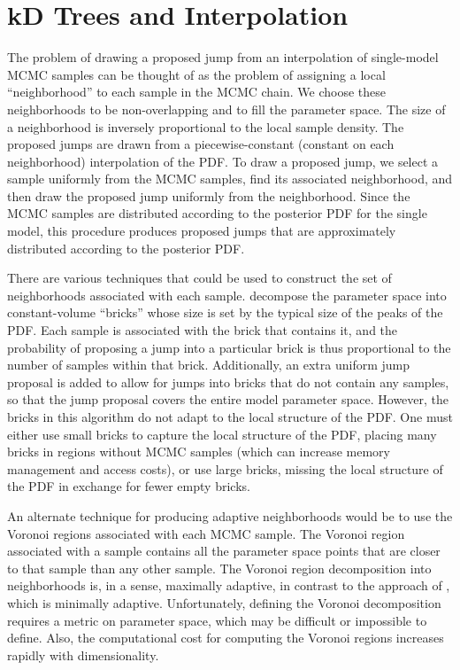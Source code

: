 \documentclass{iopart}
\begin{document}
\section{kD Trees and Interpolation}
\label{sec:kDTree}

The problem of drawing a proposed jump from an interpolation of
single-model MCMC samples can be thought of as the problem of assigning
a local ``neighborhood'' to each sample in the MCMC chain.
We choose these neighborhoods to be non-overlapping and to fill the parameter
space.  The size of a
neighborhood is inversely proportional to the local sample density.
The proposed jumps are drawn from a piecewise-constant (constant on
each neighborhood) interpolation of the PDF.  
To draw a proposed jump, we select a sample uniformly from the
MCMC samples, find its associated neighborhood, and then draw the
proposed jump uniformly from the neighborhood.  Since the MCMC samples
are distributed according to the posterior PDF for the single model,
this procedure produces proposed jumps that are approximately
distributed according to the posterior PDF.  

There are various
techniques that could be used to construct the set of neighborhoods
associated with each sample.
\cite{Littenberg2009} decompose the parameter space into
constant-volume ``bricks'' whose size is set by the typical size of
the peaks of the PDF.  Each sample is associated with the brick that
contains it, and the probability of proposing a jump into a particular brick is thus proportional to the
number of samples within that brick.  Additionally, an extra uniform jump proposal is added to allow for jumps into bricks that do not contain any samples, so that the jump 
proposal covers the entire model parameter space.  
However, the bricks in this algorithm do not adapt to the local
structure of the PDF.  One must either use small bricks to capture the
local structure of the PDF, placing many bricks in regions without
MCMC samples (which can increase memory management and access costs),
or use large bricks, missing the local structure of the PDF in
exchange for fewer empty bricks.

An alternate technique for producing adaptive neighborhoods would be
to use the Voronoi regions \cite{Voronoi1907} associated with each
MCMC sample.  The Voronoi region associated with a sample contains all
the parameter space points that are closer to that sample than any
other sample.  The Voronoi region decomposition into neighborhoods is,
in a sense, maximally adaptive, in contrast to the approach of
\cite{Littenberg2009}, which is minimally adaptive.
Unfortunately, defining the Voronoi decomposition requires a metric on
parameter space, which may be difficult or impossible to define.
Also, the computational cost for computing the Voronoi regions
increases rapidly with dimensionality.  
\end{document}
